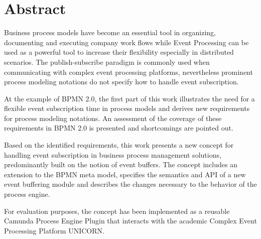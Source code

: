 \begingroup
\let\clearpage\relax
\let\cleardoublepage\relax
\let\cleardoublepage\relax

\chapter*{Abstract}
Business process models have become an essential tool in organizing, documenting and executing company work flows while Event Processing can be used as a powerful tool to increase their flexibility especially in distributed scenarios. 
The publish-subscribe paradigm is commonly used when communicating with complex event processing platforms, nevertheless prominent process modeling notations do not specify how to handle event subscription.

At the example of BPMN 2.0, the first part of this work illustrates the need for a flexible event subscription time in process models and derives new requirements for process modeling notations. An assessment of the coverage of these requirements in BPMN 2.0 is presented and shortcomings are pointed out.

Based on the identified requirements, this work presents a new concept for handling event subscription in business process management solutions, predominantly built on the notion of event buffers. The concept includes an extension to the BPMN meta model, specifies the semantics and API of a new event buffering module and describes the changes necessary to the behavior of the process engine.

For evaluation purposes, the concept has been implemented as a reusable Camunda Process Engine Plugin that interacts with the academic Complex Event Processing Platform UNICORN.

\pagebreak
\vfill


